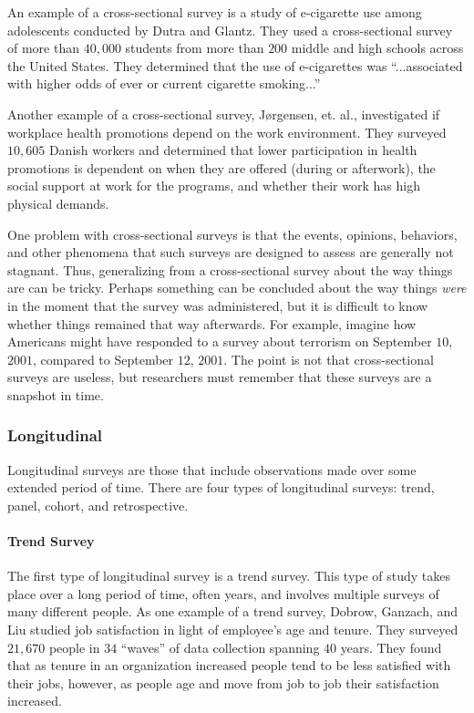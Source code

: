 An example of a cross-sectional survey is a study of e-cigarette use among adolescents conducted by Dutra and Glantz\cite{dutra2014electronic}. They used a cross-sectional survey of more than $ 40,000 $ students from more than $ 200 $ middle and high schools across the United States. They determined that the use of e-cigarettes was ``...associated with higher odds of ever or current cigarette smoking...''

Another example of a cross-sectional survey, J\o{}rgensen, et. al.\cite{jorgensen2016does}, investigated if workplace health promotions depend on the work environment. They surveyed $ 10,605 $ Danish workers and determined that lower participation in health promotions is dependent on when they are offered (during or afterwork), the social support at work for the programs, and whether their work has high physical demands.

One problem with cross-sectional surveys is that the events, opinions, behaviors, and other phenomena that such surveys are designed to assess are generally not stagnant. Thus, generalizing from a cross-sectional survey about the way things are can be tricky. Perhaps something can be concluded about the way things \textit{were} in the moment that the survey was administered, but it is difficult to know whether things remained that way afterwards. For example, imagine how Americans might have responded to a survey about terrorism on September $ 10 $, $ 2001 $, compared to September $ 12 $, $ 2001 $. The point is not that cross-sectional surveys are useless, but researchers must remember that these surveys are a snapshot in time.

\subsubsection{Longitudinal}

Longitudinal surveys are those that include observations made over some extended period of time. There are four types of longitudinal surveys: trend, panel, cohort, and retrospective.

\paragraph{Trend Survey}

The first type of longitudinal survey is a trend survey. This type of study takes place over a long period of time, often years, and involves multiple surveys of many different people. As one example of a trend survey, Dobrow, Ganzach, and Liu\cite{dobrow2015time} studied job satisfaction in light of employee's age and tenure. They surveyed $ 21,670 $ people in $ 34 $ ``waves'' of data collection spanning $ 40 $ years. They found that as tenure in an organization increased people tend to be less satisfied with their jobs, however, as people age and move from job to job their satisfaction increased.

